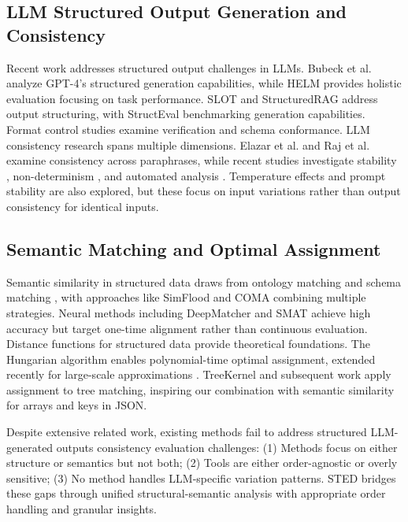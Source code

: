 \documentclass{article}
\begin{document}
\subsection{LLM Structured Output Generation and Consistency}
Recent work addresses structured output challenges in LLMs. Bubeck et al. \cite{Bubeck2023} analyze GPT-4's structured generation capabilities, while HELM \cite{Liang2022} provides holistic evaluation focusing on task performance. SLOT \cite{Wang2024slot} and StructuredRAG \cite{shorten2024structuredrag} address output structuring, with StructEval \cite{yang2025structeval} benchmarking generation capabilities. Format control studies \cite{wang-etal-2025-verifiable, geng2025jsonschema} examine verification and schema conformance.
LLM consistency research spans multiple dimensions. Elazar et al. \cite{elazar2021measuring} and Raj et al. \cite{Raj2023} examine consistency across paraphrases, while recent studies investigate stability \cite{atil2024llm}, non-determinism \cite{baldwin2024nondeterminism}, and automated analysis \cite{patwardhan2025automated, wu2025estimating}. Temperature effects \cite{renze2024effect, renze-2024-effect} and prompt stability \cite{chen2025prompt} are also explored, but these focus on input variations rather than output consistency for identical inputs.
\subsection{Semantic Matching and Optimal Assignment}
Semantic similarity in structured data draws from ontology matching \cite{Euzenat2013} and schema matching \cite{Rahm2001}, with approaches like SimFlood \cite{Melnik2002} and COMA \cite{Do2002} combining multiple strategies. Neural methods including DeepMatcher \cite{Mudgal2018} and SMAT \cite{Zhang2021smat} achieve high accuracy but target one-time alignment rather than continuous evaluation. Distance functions for structured data \cite{ontanon2020overview, kriegel2005similarity, yang2005similarity} provide theoretical foundations.
The Hungarian algorithm \cite{Kuhn1955, Munkres1957} enables polynomial-time optimal assignment, extended recently for large-scale approximations \cite{Schwiegelshohn2022}. TreeKernel \cite{Collins2001} and subsequent work \cite{Moschitti2006} apply assignment to tree matching, inspiring our combination with semantic similarity for arrays and keys in JSON.

Despite extensive related work, existing methods fail to address structured LLM-generated outputs consistency evaluation challenges:
(1) Methods focus on either structure or semantics but not both;
(2) Tools are either order-agnostic or overly sensitive;
(3) No method handles LLM-specific variation patterns.
STED bridges these gaps through unified structural-semantic analysis with appropriate order handling and granular insights.
\vspace{-3mm}
\end{document}
